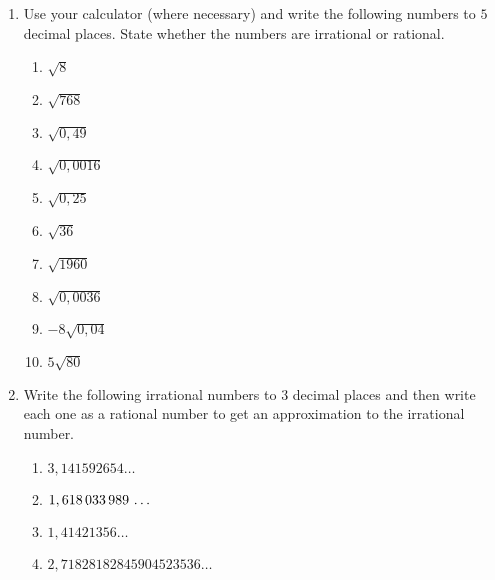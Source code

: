 \begin{eocexercises}{}
\begin{enumerate}[itemsep=5pt, label=\textbf{\arabic*}. ]
\item Use your calculator (where necessary) and write the following numbers to $5$ decimal places. State whether the numbers are irrational or rational.
\begin{multicols}{2}
    \begin{enumerate}[itemsep=5pt, label=\textbf{(\alph*)} ] 
    \item $\sqrt{8}$
    \item $\sqrt{768}$
    \item $\sqrt{0,49}$
    \item $\sqrt{0,0016}$
    \item $\sqrt{0,25}$
    \item $\sqrt{36}$
    \item $\sqrt{1960}$
    \item $\sqrt{0,0036}$
    \item $-8\sqrt{0,04}$
    \item $5\sqrt{80}$
    \end{enumerate}
\end{multicols}

\item Write the following irrational numbers to $3$ decimal places and then write each one as a rational number to get an approximation to the irrational number.
\begin{multicols}{2}
\begin{enumerate}[itemsep=5pt, label=\textbf{(\alph*)} ] 
    \item $3,141592654\ldots$
    \item $1,618\phantom{\rule{0.166667em}{0ex}}033\phantom{\rule{0.166667em}{0ex}}989\phantom{\rule{0.166667em}{0ex}}\ldots$
    \item $1,41421356\ldots$
    \item $2,71828182845904523536\ldots$
    \end{enumerate}
\end{multicols}




\end{enumerate}
\end{eocexercises}
